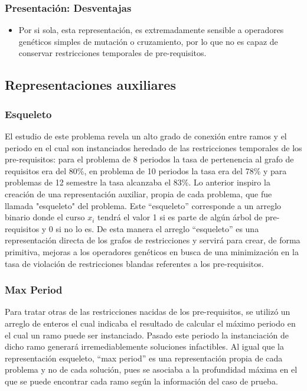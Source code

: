 \documentclass[letter, 10pt]{article}
\begin{document}
\subsubsection{Presentación: Desventajas}
\begin{itemize}
	\item Por si sola, esta representación, es extremadamente sensible a
          operadores genéticos simples de mutación o cruzamiento, por lo que no
          es capaz de conservar restricciones temporales de pre-requisitos.
\end{itemize}

\subsection{Representaciones auxiliares}
\subsubsection{Esqueleto}
El estudio de este problema revela un alto grado de conexión entre
ramos y el periodo en el cual son instanciados heredado de las
restricciones temporales de los pre-requisitos: para el problema de 8
periodos la tasa de pertenencia al grafo de requisitos era del 80\%,
en problema de 10 periodos la tasa era del 78\% y para problemas de 12
semestre la tasa alcanzaba el 83\%. Lo anterior inspiro la creación de
una representación auxiliar, propia de cada problema, que fue llamada
"esqueleto" del problema.  Este ``esqueleto'' corresponde a un arreglo
binario donde el curso $x_{i}$ tendrá el valor 1 si es parte de algún
árbol de pre-requisitos y 0 si no lo es. De esta manera el arreglo
``esqueleto'' es una representación directa de los grafos de
restricciones y servirá para crear, de forma primitiva, mejoras a los
operadores genéticos en busca de una minimización en la tasa de
violación de restricciones blandas referentes a los pre-requisitos.

\subsubsection{Max Period}
Para tratar otras de las restricciones nacidas de los pre-requisitos,
se utilizó un arreglo de enteros el cual indicaba el resultado de
calcular el máximo periodo en el cual un ramo puede ser
instanciado. Pasado este periodo la instanciación de dicho ramo
generará irremediablemente soluciones infactibles. Al igual que la
representación esqueleto, ``max period'' es una representación propia
de cada problema y no de cada solución, pues se asociaba a la
profundidad máxima en el que se puede encontrar cada ramo según la
información del caso de prueba.
\end{document}
